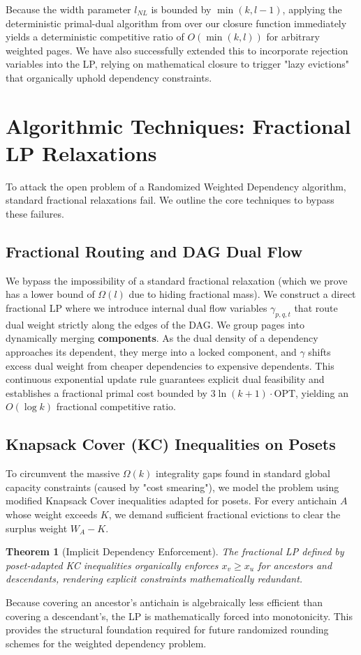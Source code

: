 \documentclass[a4paper,11pt]{article}
\newtheorem{theorem}{Theorem}
\begin{document}
Because the width parameter $l_{NL}$ is bounded by $\min(k, l-1)$, applying the deterministic primal-dual algorithm from \cite{DoronAradetal2024} over our closure function immediately yields a deterministic competitive ratio of $O(\min(k, l))$ for arbitrary weighted pages. We have also successfully extended this to incorporate rejection variables into the LP, relying on mathematical closure to trigger "lazy evictions" that organically uphold dependency constraints.

\section{Algorithmic Techniques: Fractional LP Relaxations}

To attack the open problem of a Randomized Weighted Dependency algorithm, standard fractional relaxations fail. We outline the core techniques to bypass these failures.

\subsection{Fractional Routing and DAG Dual Flow}
We bypass the impossibility of a standard fractional relaxation (which we prove has a lower bound of $\Omega(l)$ due to hiding fractional mass). 
We construct a direct fractional LP where we introduce internal dual flow variables $\gamma_{p,q,t}$ that route dual weight strictly along the edges of the DAG. We group pages into dynamically merging \textbf{components}. As the dual density of a dependency approaches its dependent, they merge into a locked component, and $\gamma$ shifts excess dual weight from cheaper dependencies to expensive dependents. This continuous exponential update rule guarantees explicit dual feasibility and establishes a fractional primal cost bounded by $3 \ln(k+1) \cdot \text{OPT}$, yielding an $O(\log k)$ fractional competitive ratio.

\subsection{Knapsack Cover (KC) Inequalities on Posets}
To circumvent the massive $\Omega(k)$ integrality gaps found in standard global capacity constraints (caused by "cost smearing"), we model the problem using modified Knapsack Cover inequalities adapted for posets. For every antichain $A$ whose weight exceeds $K$, we demand sufficient fractional evictions to clear the surplus weight $W_A - K$. 

\begin{theorem}[Implicit Dependency Enforcement]
The fractional LP defined by poset-adapted KC inequalities organically enforces $x_v \ge x_u$ for ancestors and descendants, rendering explicit constraints mathematically redundant.
\end{theorem}
Because covering an ancestor's antichain is algebraically less efficient than covering a descendant's, the LP is mathematically forced into monotonicity. This provides the structural foundation required for future randomized rounding schemes for the weighted dependency problem.

\newpage
\printbibliography
\end{document}
